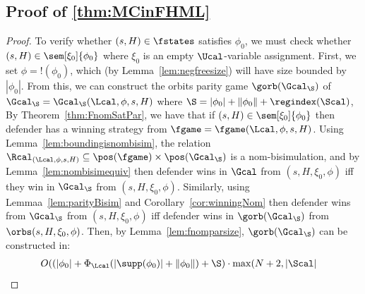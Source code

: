 \subsection{Proof of \cref{thm:MCinFHML}}
\MCinFHML*
  \begin{proof}
To verify whether $(s, H) \in \fstates$ satisfies $\phi_0$, we must check whether $(s, H) \in \sem[\xi_0]{\phi_0}$ where $\xi_0$ is an empty $\Ucal$-variable assignment. 
First, we set $\phi = !(\phi_0)$, which (by Lemma~\ref{lem:negfreesize}) will have size bounded by $|\phi_0|$. 
From this, we can construct the orbits parity game $\gorb(\Gcal_\S)$ of $\Gcal_\S = \Gcal_\S(\Lcal, \phi, s, H)$ where $\S = |\phi_0| + \|\phi_0\| + \regindex(\Scal)$, 
By Theorem~\ref{thm:FnomSatPar}, we have that if $(s, H) \in \sem[\xi_0]{\phi_0}$ then defender has a winning strategy from $\fgame = \fgame(\Lcal, \phi, s, H)$.
Using Lemma~\ref{lem:boundingisnombisim}, the relation $\Rcal_{(\Lcal, \phi, s, H)} \subseteq \pos(\fgame) \times \pos(\Gcal_\S)$ is a nom-bisimulation, 
and by Lemma~\ref{lem:nombisimequiv} then defender wins in $\Gcal$ from $(s, H, \xi_0, \phi)$ iff they win in $\Gcal_\S$ from $(s, H, \xi_0, \phi)$.
Similarly, using Lemmaa~\ref{lem:parityBisim} and Corollary~\ref{cor:winningNom} then defender wins from $\Gcal_\S$ from $(s, H, \xi_0, \phi)$ iff defender wins in $\gorb(\Gcal_\S)$ from $\orbs(s, H, \xi_0, \phi)$. 
Then, by Lemma~\ref{lem:fnomparsize}, $\gorb(\Gcal_\S)$ can be constructed in:
    \begin{align*}
	&O(
	(|\phi_0| + \Phi_\Lcal(|\supp(\phi_0)| + \|\phi_0\|) + \S)
	\cdot
	\max(N + 2, |\Scal|

\end{align*}
\end{proof}
